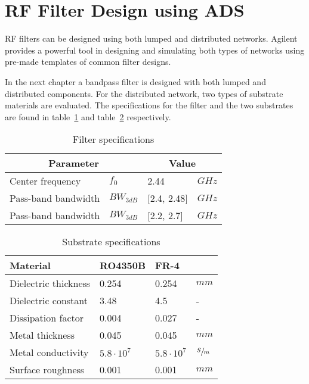 \documentclass[report.tex]{subfiles}
\begin{document}
\pagebreak \section{RF Filter Design using ADS}
RF filters can be designed using both lumped and distributed networks. Agilent provides a powerful tool in designing and simulating both types of networks using pre-made templates of common filter designs.

In the next chapter a bandpass filter is designed with both lumped and distributed components. For the distributed network, two types of substrate materials are evaluated. The specifications for the filter and the two substrates are found in table~\ref{tab:filter specs} and table~\ref{tab:substrate specs} respectively.

\begin{table}[h]
    \centering
    \caption{Filter specifications}
    \begin{tabular}{l l l l}
        \multicolumn{2}{c}{Parameter} & \multicolumn{2}{c}{Value}\\
        \hline
        Center frequency & $f_0$ & 2.44 & $GHz$\\
        Pass-band bandwidth & $BW_{3 dB}$ & [2.4, 2.48] & $GHz$\\
        Pass-band bandwidth & $BW_{3 dB}$ & [2.2, 2.7]  & $GHz$\\
    \end{tabular}
    \label{tab:filter specs}
\end{table}

\begin{table}[h]
    \centering
    \caption{Substrate specifications}
    \begin{tabular}{l l l l}
        Material & RO4350B & FR-4 & \\
        \hline
        Dielectric thickness & 0.254 & 0.254 & $mm$\\
        Dielectric constant  & 3.48  & 4.5   & -\\
        Dissipation factor   & 0.004 & 0.027 & -\\
        Metal thickness      & 0.045 & 0.045 & $mm$\\
        Metal conductivity   & $5.8 \cdot 10^{7}$ & $5.8 \cdot 10^{7}$ & $\sfrac{S}{m}$\\
        Surface roughness    & 0.001 & 0.001 & $mm$\\
    \end{tabular}
    \label{tab:substrate specs}
\end{table}








\end{document}
